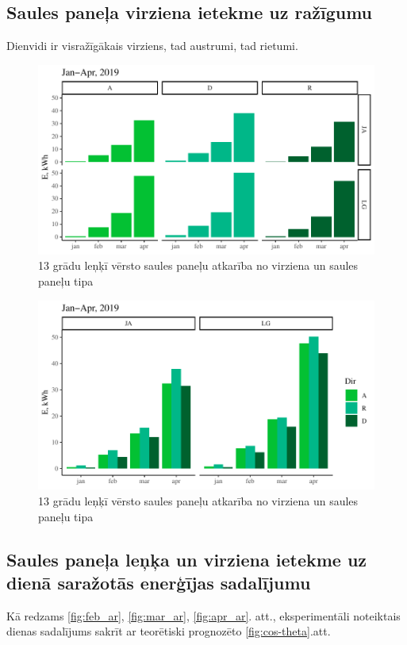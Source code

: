 \subsection{Saules paneļa virziena ietekme uz ražīgumu}
Dienvidi ir visražīgākais virziens, tad austrumi, tad rietumi.
\begin{figure}[h]
    \centering
    \includegraphics[width=\linewidth]{figures/results/jan_all_dir.pdf}
    \caption{13 grādu leņķī vērsto saules paneļu atkarība no virziena un saules paneļu tipa}
    \label{fig:ja_dir}
\end{figure}

\begin{figure}[h]
    \centering
    \includegraphics[width=\linewidth]{figures/results/dirType.pdf}
    \caption{13 grādu leņķī vērsto saules paneļu atkarība no virziena un saules paneļu tipa}
    \label{fig:lg_ja_dir}
\end{figure}

\subsection{Saules paneļa leņķa un virziena ietekme uz dienā saražotās enerģījas sadalījumu}
Kā redzams \ref{fig:feb_ar}, \ref{fig:mar_ar}, \ref{fig:apr_ar}. att., eksperimentāli noteiktais dienas sadalījums sakrīt ar teorētiski prognozēto \ref{fig:cos-theta}.att.

